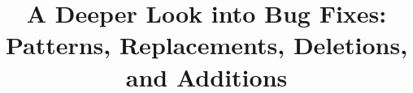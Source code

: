 \documentclass{sig-alternate-05-2015}
\begin{document}






%

\title{A Deeper Look into Bug Fixes: Patterns, Replacements, Deletions, and Additions}

%
%
%
%
%
\end{document}
